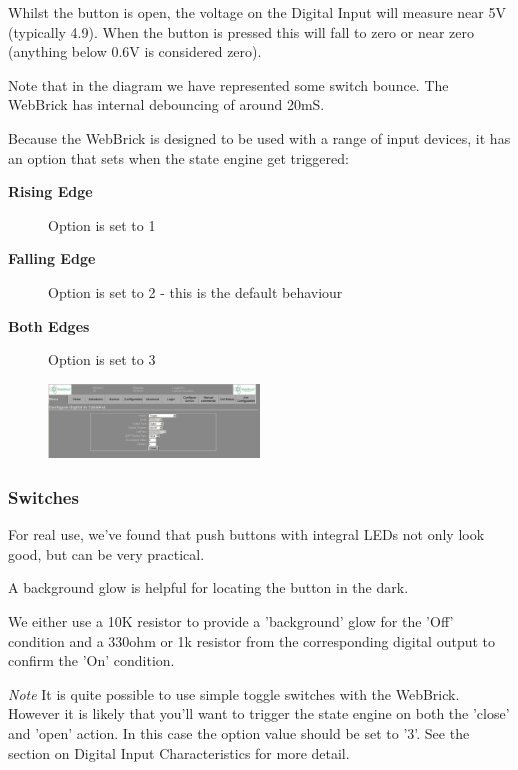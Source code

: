 		Whilst the button is open, the voltage on the Digital Input will measure near 5V (typically 4.9). When the button
		is pressed this will fall to zero or near zero (anything below 0.6V is considered zero).
		
		Note that in the diagram we have represented some switch bounce.  The WebBrick has internal
		debouncing of around 20mS.
		
		Because the WebBrick is designed to be used with a range of input devices, it has an option that sets when the state engine
		get triggered:
		
			\begin{description}
				\item[{\bf Rising Edge}] Option is set to 1
				\item[{\bf Falling Edge}] Option is set to 2 - this is the default behaviour
				\item[{\bf Both Edges}] Option is set to 3
			\end{description}
		
		    \begin{figure}[H]
		    \centering
		    \includegraphics[width=0.5\textwidth]{Images/DigitalIn.png}
		    \end{figure}


	\subsubsection{Switches}
	For real use, we've found that push buttons with integral LEDs not only look good, but can be very practical.

	A background glow is helpful for locating the button in the dark.

	We either use a 10K resistor to provide a 'background' glow for the 'Off' condition and a 330ohm or 1k resistor 
	from the corresponding digital output to confirm the 'On' condition.

	{\it Note}  It is quite possible to use simple toggle switches with the WebBrick.  However it
	is likely that you'll want to trigger the state engine on both the 'close' and 'open' action.  In this case the option value should
	be set to '3'.  See the section on Digital Input Characteristics for more detail.

